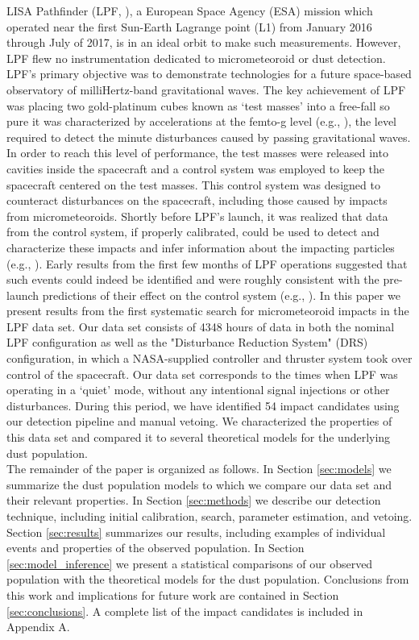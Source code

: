 \documentclass[twocolumn, trackchanges]{aastex62}
\newcommand{\nhits}{54 } %
\newcommand{\nhours}{4348 }
\begin{document}
LISA Pathfinder (LPF, \cite{Antonucci_2011a}), a European Space Agency (ESA) mission which operated near the first Sun-Earth Lagrange point (L1) from January 2016 through July of 2017, is in an ideal orbit to make such measurements. However, LPF flew no instrumentation dedicated to micrometeoroid or dust detection.  LPF's primary objective was to demonstrate technologies for a future space-based observatory of milliHertz-band gravitational waves. The key achievement of LPF was placing two gold-platinum cubes known as `test masses' into a free-fall so pure it was characterized by accelerations at the femto-g level (e.g., \cite{LPF_PRL_2016, LPF_PRL_2018}), the level required to detect the minute disturbances caused by passing gravitational waves. In order to reach this level of performance, the test masses were released into cavities inside the spacecraft and a control system was employed to keep the spacecraft centered on the test masses.  This control system was designed to counteract disturbances on the spacecraft, including those caused by impacts from micrometeoroids. Shortly before LPF's launch, it was realized that data from the control system, if properly calibrated, could be used to detect and characterize these impacts and infer information about the impacting particles (e.g., \cite{Thorpe:2015cxa}). Early results from the first few months of LPF operations suggested that such events could indeed be identified and were roughly consistent with the pre-launch predictions of their effect on the control system (e.g., \cite{Thorpe2017a}). In this paper we present results from the first systematic search for micrometeoroid impacts in the LPF data set.  Our data set consists of \nhours hours of data in both the nominal LPF configuration as well as the "Disturbance Reduction System" (DRS) configuration, in which a NASA-supplied controller and thruster system took over control of the spacecraft. Our data set corresponds to the times when LPF was operating in a `quiet' mode, without any intentional signal injections or other disturbances. During this period, we have identified \nhits impact candidates using our detection pipeline and manual vetoing. We characterized the properties of this data set and compared it to several theoretical models for the underlying dust population. 
\\
The remainder of the paper is organized as follows. In Section \ref{sec:models} we summarize the dust population models to which we compare our data set and their relevant properties. In Section \ref{sec:methods} we describe our detection technique, including initial calibration, search, parameter estimation, and vetoing. Section \ref{sec:results} summarizes our results, including examples of individual events and properties of the observed population. In Section \ref{sec:model_inference} we present a statistical comparisons of our observed population with the theoretical models for the dust population. Conclusions from this work and implications for future work are contained in Section \ref{sec:conclusions}. A complete list of the impact candidates is included in Appendix A. 
\end{document}
